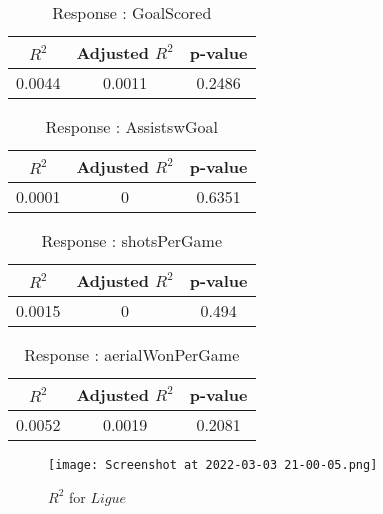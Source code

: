 \documentclass[12pt]{article}
\begin{document}
	
\begin{minipage}{0.5\textwidth}
	\begin{table}[H]
	\centering
	\caption{Response : GoalScored}\label{table:1a}
	{\begin{tabular}{|c|c|c|}
			\hline
			$ R^2 $ & Adjusted $ R^2 $ & p-value \\
			\hline
			0.0044 & 0.0011 & 0.2486 \\
			\hline
		\end{tabular}
	}
\end{table}
\begin{table}[H]
	\centering
	\caption{Response : AssistswGoal}\label{table:1a}
	{\begin{tabular}{|c|c|c|}
			\hline
			$ R^2 $ & Adjusted $ R^2 $ & p-value \\
			\hline
			0.0001 & 0 & 0.6351 \\
			\hline
		\end{tabular}
	}
\end{table}
\end{minipage}
\hfill
\begin{minipage}{0.5\textwidth}

\begin{table}[H]
	\centering
	\caption{Response : shotsPerGame }\label{table:1a}
	{\begin{tabular}{|c|c|c|}
			\hline
			$ R^2 $ & Adjusted $ R^2 $ & p-value \\
			\hline
			0.0015 & 0 & 0.494 \\
			\hline
		\end{tabular}
	}
\end{table}
\begin{table}[H]
	\centering
	\caption{Response : aerialWonPerGame}\label{table:1a}
	{\begin{tabular}{|c|c|c|}
			\hline
			$ R^2 $ & Adjusted $ R^2 $ & p-value \\
			\hline
			0.0052 & 0.0019 & 0.2081 \\
			\hline
		\end{tabular}
	}
\end{table}
\end{minipage}


\begin{figure}[H]
	\centering
	\texttt{[image: Screenshot at 2022-03-03 21-00-05.png]}
	\caption{$ R^2 $ for $ Ligue $}
	\label{fig:1}
\end{figure}
\end{document}
